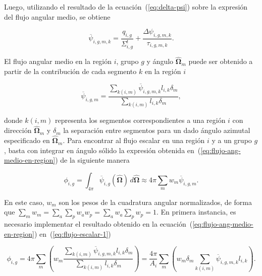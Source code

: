 \documentclass[11pt]{article}
\begin{document}
\noindent
Luego, utilizando el resultado de la ecuación~(\ref{eq:delta-psi}) sobre la expresi\'on del flujo angular medio, se obtiene

\begin{equation} \label{eq:flujo-ang-medio-en-segmento}
 \overline{\psi}_{i,g,m,k} = \frac{q_{i,g}}{\Sigma^t_{i,g}} + \frac{\Delta \psi_{i,g,m,k}}{\tau_{i,g,m,k}}.
\end{equation}

El flujo angular medio en la región $i$, grupo $g$ y ángulo $\boldsymbol{\hat{\Omega}}_m$ puede ser obtenido a partir de la contribuci\'on de cada segmento $k$ en la región $i$

\begin{equation} \label{eq:flujo-ang-medio-en-region}
 \overline{\psi}_{i,g,m} = \frac{\sum_{k(i,m)} \overline{\psi}_{i,g,m,k} l_{i,k} \delta_m}{\sum_{k(i,m)} l_{i,k} \delta_m},
\end{equation}

\noindent
donde $k(i,m)$ representa los segmentos correspondientes a una región $i$ con dirección $\boldsymbol{\hat{\Omega}}_m$ y $\delta_m$ la separaci\'on entre segmentos para un dado ángulo azimutal especificado en $\boldsymbol{\hat{\Omega}}_m$. Para encontrar al flujo escalar en una región $i$ y a un grupo $g$, basta con integrar en ángulo s\'olido la expresi\'on obtenida en~(\ref{eq:flujo-ang-medio-en-region}) de la siguiente manera

\begin{equation} \label{eq:flujo-escalar-1}
 \phi_{i,g} = \int_{4\pi} \overline{\psi}_{i,g} (\boldsymbol{\hat{\Omega}}) \, d\boldsymbol{\hat{\Omega}} \approx 
 4\pi \sum_m w_m \overline{\psi}_{i,g,m}.
\end{equation}

\noindent
En este caso, $w_m$ son los pesos de la cuadratura angular normalizados, de forma que $\sum_m w_m = \sum_a \sum_p w_a w_p = \sum_a w_a \sum_p w_p = 1$. En primera instancia, es necesario implementar el resultado obtenido en la ecuación~(\ref{eq:flujo-ang-medio-en-region}) en~(\ref{eq:flujo-escalar-1})

\begin{equation} \label{eq:flujo-escalar-2}
 \phi_{i,g} =
 4\pi \sum_m \left( w_m \frac{\sum_{k(i,m)} \overline{\psi}_{i,g,m,k} l_{i,k} \delta_m}{\sum_{k(i,m)} l_{i,k} \delta_m} \right) = 
 \frac{4\pi}{A_i} \sum_m \left( w_m \delta_m \sum_{k(i,m)} \overline{\psi}_{i,g,m,k} l_{i,k} \right).
\end{equation}
\end{document}
